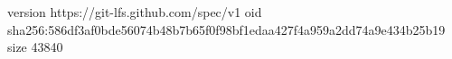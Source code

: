version https://git-lfs.github.com/spec/v1
oid sha256:586df3af0bde56074b48b7b65f0f98bf1edaa427f4a959a2dd74a9e434b25b19
size 43840
